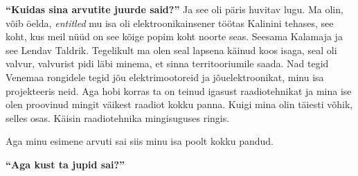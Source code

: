 
\textbf{\enquote{Kuidas sina arvutite juurde said?}}
Ja see oli päris huvitav lugu. Ma olin, võib öelda, \emph{entitled} mu isa oli elektroonikainsener töötas Kalinini tehases, see koht, kus meil nüüd on see kõige popim koht noorte seas. Seesama Kalamaja ja see Lendav Taldrik. Tegelikult ma olen seal lapsena käinud koos isaga, seal oli valvur, valvurist pidi läbi minema, et sinna territooriumile saada. Nad tegid Venemaa rongidele tegid jõu elektrimootoreid ja jõuelektroonikat, minu isa projekteeris neid. Aga hobi korras ta on teinud igasust raadiotehnikat ja mina ise olen proovinud mingit väikest raadiot kokku panna. Kuigi mina olin täiesti võhik, selles osas. Käisin raadiotehnika mingisuguses ringis.

Aga minu esimene arvuti sai siis minu isa poolt kokku pandud.

\textbf{\enquote{Aga kust ta jupid sai?}}

